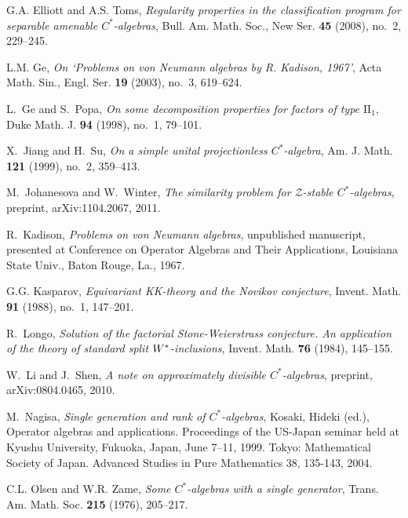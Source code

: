 \documentclass{amsart}
\theoremstyle{definition}
\begin{document}
\begin{thebibliography}{DHTW09}
G.A. Elliott and A.S. Toms, \emph{{Regularity properties in the classification
  program for separable amenable {{$C^*$-al\-ge\-bra}}{s}}}, Bull. Am. Math. Soc., New Ser.
  \textbf{45} (2008), no.~2, 229--245.

L.M. Ge, \emph{{On `Problems on von Neumann algebras by R. Kadison, 1967'}},
  Acta Math. Sin., Engl. Ser. \textbf{19} (2003), no.~3, 619--624.

L.~Ge and S.~Popa, \emph{{On some decomposition properties for factors of type
  $\text{II}_1$}}, Duke Math. J. \textbf{94} (1998), no.~1, 79--101.

X.~Jiang and H.~Su, \emph{{On a simple unital projectionless {{$C^*$-al\-ge\-bra}}{}}}, Am. J.
  Math. \textbf{121} (1999), no.~2, 359--413.

M.~Johanesova and W.~Winter, \emph{{The similarity problem for
  $\mathcal{Z}$-stable {{$C^*$-al\-ge\-bra}}{s}}}, {preprint, arXiv:1104.2067}, 2011.

R.~Kadison, \emph{{Problems on von Neumann algebras}}, {unpublished manuscript,
  presented at Conference on Operator Algebras and Their Applications,
  Louisiana State Univ., Baton Rouge, La.}, 1967.

G.G. Kasparov, \emph{{Equivariant KK-theory and the Novikov conjecture}},
  Invent. Math. \textbf{91} (1988), no.~1, 147--201.

R.~Longo, \emph{{Solution of the factorial Stone-Weierstrass conjecture. An
  application of the theory of standard split $W\sp*$-inclusions}}, Invent.
  Math. \textbf{76} (1984), 145--155.

W.~Li and J.~Shen, \emph{{A note on approximately divisible {{$C^*$-al\-ge\-bra}}{s}}}, preprint,
  arXiv:0804.0465, 2010.

M.~Nagisa, \emph{{Single generation and rank of {{$C^*$-al\-ge\-bra}}{s}}}, {Kosaki, Hideki
  (ed.), Operator algebras and applications. Proceedings of the US-Japan
  seminar held at Kyushu University, Fukuoka, Japan, June 7--11, 1999. Tokyo:
  Mathematical Society of Japan. Advanced Studies in Pure Mathematics 38,
  135-143}, 2004.

C.L. Olsen and W.R. Zame, \emph{{Some {{$C^*$-al\-ge\-bra}}{s} with a single generator}}, Trans.
  Am. Math. Soc. \textbf{215} (1976), 205--217.


\end{thebibliography}
\end{document}
